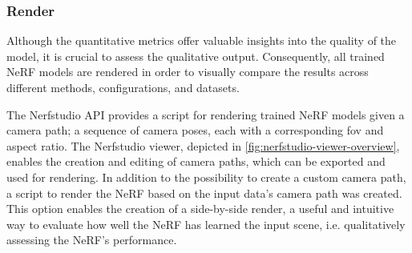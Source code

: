 \subsubsection{Render}

Although the quantitative metrics offer valuable insights into the quality of the model, it is crucial to assess the qualitative output. Consequently, all trained NeRF models are rendered in order to visually compare the results across different methods, configurations, and datasets.

The Nerfstudio API provides a script for rendering trained NeRF models given a camera path; a sequence of camera poses, each with a corresponding \acrshort{fov} and aspect ratio. The Nerfstudio viewer, depicted in \autoref{fig:nerfstudio-viewer-overview}, enables the creation and editing of camera paths, which can be exported and used for rendering. In addition to the possibility to create a custom camera path, a script to render the NeRF based on the input data's camera path was created. This option enables the creation of a side-by-side render, a useful and intuitive way to evaluate how well the NeRF has learned the input scene, i.e. qualitatively assessing the NeRF's performance.


%


